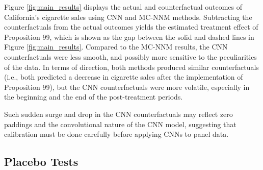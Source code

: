 Figure \ref{fig:main_results} displays the actual and counterfactual outcomes
of California's cigarette sales using CNN and MC-NNM methods.
Subtracting the counterfactuals from the actual outcomes yields the estimated treatment effect of Proposition 99, which is shown as the gap between the solid and dashed lines in Figure \ref{fig:main_results}.
Compared to the MC-NNM results, the CNN counterfactuals were less smooth, and possibly more sensitive to the 
peculiarities of the data.
In terms of direction, both methods produced similar counterfactuals (i.e., both predicted a decrease in cigarette sales after the implementation of Proposition 99),
but the CNN counterfactuals were more volatile, especially in the beginning and the end of the post-treatment periods.

Such sudden surge and drop in the CNN counterfactuals may reflect zero paddings and the convolutional nature of the CNN model,
suggesting that calibration must be done carefully before applying CNNs to panel data.




\subsection{Placebo Tests}

